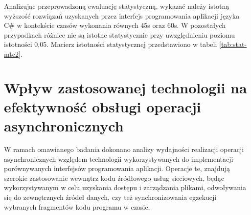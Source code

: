 Analizując przeprowadzoną ewaluację statystyczną, wykazać należy istotną wyższość rozwiązań uzyskanych przez interfejs programowania aplikacji języka C\# w kontekście czasów wykonania równych 45s oraz 60s. W pozostałych przypadkach różnice nie są istotne statystycznie przy uwzględnieniu poziomu istotności 0,05. Macierz istotności statystycznej przedstawiono w tabeli \ref{tab:stat-mtc2}.

\begin{table}[htb]
  \centering
  \caption{Macierz istotności statystycznej dla współczynników jakości rozwiązania pozyskanych w ramach badania wydajności obsługi operacji współbieżnych}
  \label{tab:stat-mtc2}
  \end{table}

\section{Wpływ zastosowanej technologii na efektywność obsługi operacji asynchronicznych}
W ramach omawianego badania dokonano analizy wydajności realizacji operacji asynchronicznych względem technologii wykorzystywanych do implementacji porównywanych interfejsów programowania aplikacji. Operacje te, znajdują szerokie zastosowanie wewnątrz kodu źródłowego usług sieciowych, będąc wykorzystywanym w celu uzyskania dostępu i zarządzania plikami, odwoływania się do zewnętrznych źródeł danych, czy też synchronizowania egzekucji wybranych fragmentów kodu programu w czasie.

